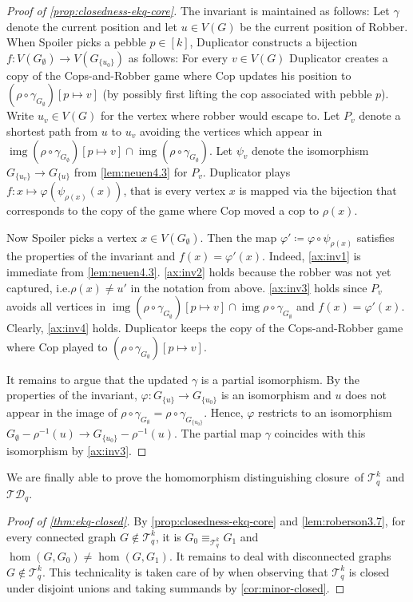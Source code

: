 \documentclass{lmcs}
\theoremstyle{plain}\newtheorem{claim}[thm]{Claim}   %
\newcommand{\cT}{\ensuremath{\mathcal T}}
\DeclareMathOperator{\img}{img}
\newcommand	{\homDistClure}		{homomorphism distinguishing closure}
\newcommand{\TD}{\ensuremath{\mathcal{TD}}}
\newcommand{\Ekq}{\ensuremath{\cT_{q}^{k}}}
\renewcommand\phi\varphi
\begin{document}
\begin{proof}[Proof of \autoref{prop:closedness-ekq-core}]
	The invariant is maintained as follows: Let $\gamma$ denote the current position and let $u \in V(G)$ be the current position of Robber.
	When Spoiler picks a pebble $p \in [k]$, Duplicator constructs a bijection $f \colon V(G_\emptyset) \to V\left(G_{\{u_0\}}\right)$ as follows:
	For every $v \in V(G)$ Duplicator creates a copy of the Cops-and-Robber game where Cop updates his position to $(\rho \circ \gamma_{G_\emptyset})[p \mapsto v]$ (by possibly first lifting the cop associated with pebble $p$).
	Write $u_v \in V(G)$ for the vertex where robber would escape to.
	Let $P_v$ denote a shortest path from $u$ to $u_v$ avoiding the vertices which appear in $\img (\rho \circ \gamma_{G_\emptyset})[p \mapsto v] \cap \img \left(\rho \circ \gamma_{G_\emptyset}\right)$.
	Let $\psi_v$ denote the isomorphism $G_{\{u_v\}} \to G_{\{u\}}$ from \autoref{lem:neuen4.3} for $P_v$.
	Duplicator plays $f \colon x \mapsto \phi(\psi_{\rho(x)}(x))$, that is every vertex $x$ is mapped via the bijection that corresponds to the copy of the game where Cop moved a cop to $\rho(x)$.
	
	Now Spoiler picks a vertex $x \in V(G_\emptyset)$.
	Then the map $\phi' \coloneqq \phi \circ \psi_{\rho(x)}$ satisfies the properties of the invariant and $f(x) = \phi'(x)$.
	Indeed, \ref{ax:inv1} is immediate from \autoref{lem:neuen4.3}.
	\ref{ax:inv2} holds because the robber was not yet captured, i.e.\@ $\rho(x) \neq u'$ in the notation from above.
	\ref{ax:inv3} holds since $P_v$ avoids all vertices in $\img (\rho \circ \gamma_{G_\emptyset})[p \mapsto v] \cap \img \rho \circ \gamma_{G_\emptyset}$ and $f(x) = \phi'(x)$.
	Clearly, \ref{ax:inv4} holds.
	Duplicator keeps the copy of the Cops-and-Robber game where Cop played to $(\rho \circ \gamma_{G_\emptyset})[p \mapsto v]$.
	
	It remains to argue that the updated $\gamma$ is a partial isomorphism.
	By the properties of the invariant, $\phi \colon G_{\{u\}} \to G_{\{u_0\}}$ is an isomorphism and $u$ does not appear in the image of $\rho \circ \gamma_{G_\emptyset} = \rho \circ \gamma_{G_{\{u_0\}}}$.
	Hence, $\phi$ restricts to an isomorphism $G_\emptyset - \rho^{-1}(u) \to G_{\{u_0\}} - \rho^{-1}(u)$.
	The partial map $\gamma$ coincides with this isomorphism by \ref{ax:inv3}.
\end{proof}

We are finally able to prove the \homDistClure\ of \Ekq\ and $\TD_q$.

\begin{proof}[Proof of \autoref{thm:ekq-closed}]
	By \autoref{prop:closedness-ekq-core} and \autoref{lem:roberson3.7},
	for every connected graph $G \not\in \Ekq$,
	it is $G_0 \equiv_{\Ekq} G_1$ and
	$\hom(G, G_0) \neq \hom(G, G_1)$.
	It remains to deal with disconnected graphs $G \not\in \Ekq$.
	This technicality is taken care of by \cite[Corollary~7.1.5]{seppelt_homomorphism_2024}
	when observing that $\Ekq$ is closed under disjoint unions and taking summands by \autoref{cor:minor-closed}.
\end{proof}
\end{document}
